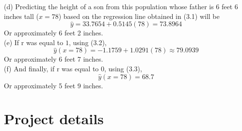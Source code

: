 \documentclass[boxes, qed]{homework}
\begin{document}
\begin{solution}
  (d) Predicting the height of a son from this population whose father is 6 feet 6 inches tall ($x=78$)
  based on the regression line obtained in (3.1) will be
  $$\hat{y} = 33.7654+0.5145(78) = 73.8964$$
  Or approximately 6 feet 2 inches.\\
  
  (e) If r was equal to $1$, using (3.2),
  $$\hat{y}(x=78) = -1.1759 + 1.0291(78) \approx 79.0939$$
  Or approximately 6 feet 7 inches.\\
  
  (f) And finally, if r was equal to $0$, using (3.3),
  $$\hat{y}(x=78) = 68.7$$
  Or approximately 5 feet 9 inches.
\end{solution}

\pagebreak

\section*{Project details}
\end{document}
